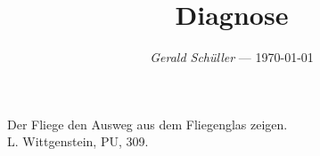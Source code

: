 \documentclass[10pt,a4paper]{article}
\newcommand{\motto}[2]{%
  \hfill
  \begin{minipage}{0.33\textwidth}
    \small{} #1 \\
    \hspace*{\fill} #2
  \end{minipage}
  \topvskip\topvskip
}
\newcommand\svthema{Diagnose}
\newcommand\svperson{Gerald Schüller}
\newcommand\svdatum{\today}
\newcommand\topvskip {\vskip 8pt}
\begin{document}
\title{ \textbf{\color{blue}\svthema} \Springtree [1.5] }
\author{ \textsl{\color{red}\svperson} --- \svdatum }
\date{}

\maketitle

\motto{Der Fliege den Ausweg aus dem Fliegenglas zeigen.}{L. Wittgenstein, PU, 309.}

\tableofcontents

\appendix






% 

\end{document}

